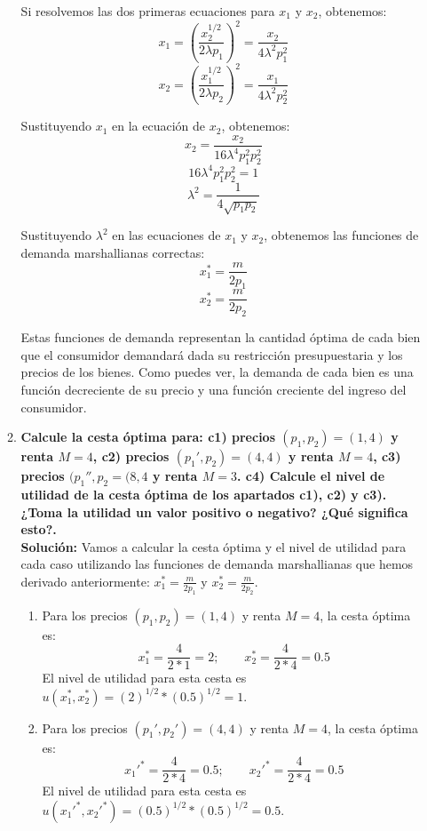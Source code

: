 \begin{enumerate}
\begin{enumerate}[\bfseries a)]
		Si resolvemos las dos primeras ecuaciones para $x_1$ y $x_2$, obtenemos:
		$$x_1 = \left(\frac{x_2^{1/2}}{2\lambda p_1}\right)^2 = \frac{x_2}{4\lambda^2 p_1^2}$$
		$$x_2 = \left(\frac{x_1^{1/2}}{2\lambda p_2}\right)^2 = \frac{x_1}{4\lambda^2 p_2^2}$$

		Sustituyendo $x_1$ en la ecuación de $x_2$, obtenemos:
		$$x_2 = \frac{x_2}{16\lambda^4 p_1^2 p_2^2}$$
		$$16\lambda^4 p_1^2 p_2^2 = 1$$
		$$\lambda^2 = \frac{1}{4\sqrt{p_1 p_2}}$$

		Sustituyendo $\lambda^2$ en las ecuaciones de $x_1$ y $x_2$, obtenemos las funciones de demanda marshallianas correctas:
		$$x_1^* = \frac{m}{2p_1}$$
		$$x_2^* = \frac{m}{2p_2}$$

		Estas funciones de demanda representan la cantidad óptima de cada bien que el consumidor demandará dada su restricción presupuestaria y los precios de los bienes. Como puedes ver, la demanda de cada bien es una función decreciente de su precio y una función creciente del ingreso del consumidor.\\

	    \item \textbf{\boldmath Calcule la cesta óptima para: c1) precios $(p_1,p_2)=(1,4)$ y renta $M=4$, c2) precios $(p_1',p_2)=(4,4)$ y renta $M=4$, c3) precios $(p_1'',p_2=(8,4$ y renta $M=3$. c4) Calcule el nivel de utilidad de la cesta óptima de los apartados c1), c2) y c3). ¿Toma la utilidad un valor positivo o negativo? ¿Qué significa esto?.}\\

		\textbf{Solución:} Vamos a calcular la cesta óptima y el nivel de utilidad para cada caso utilizando las funciones de demanda marshallianas que hemos derivado anteriormente: $x_1^* = \frac{m}{2p_1}$ y $x_2^* = \frac{m}{2p_2}$.

		\begin{enumerate}[\bfseries c1)]

		    \item Para los precios $(p_1,p_2)=(1,4)$ y renta $M=4$, la cesta óptima es:
		    $$x_1^* = \frac{4}{2*1} = 2; \qquad x_2^* = \frac{4}{2*4} = 0.5$$
		    El nivel de utilidad para esta cesta es $u(x_1^*, x_2^*) = (2)^{1/2} * (0.5)^{1/2} = 1$.\\

		    \item  Para los precios $(p_1',p_2')=(4,4)$ y renta $M=4$, la cesta óptima es:
		    $$x_1'^* = \frac{4}{2*4} = 0.5; \qquad x_2'^* = \frac{4}{2*4} = 0.5$$
		    El nivel de utilidad para esta cesta es $u(x_1'^*, x_2'^*) = (0.5)^{1/2} * (0.5)^{1/2} = 0.5$.\\


\end{enumerate}
\end{enumerate}
\end{enumerate}
